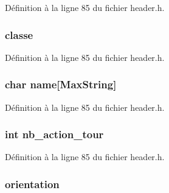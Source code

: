 Définition à la ligne 85 du fichier header.\-h.

\hypertarget{structt__character_a6d86411cdb6af508aed7d5904887ac6e}{
\subsubsection[{classe}]{ classe}}\label{structt__character_a6d86411cdb6af508aed7d5904887ac6e}


Définition à la ligne 85 du fichier header.\-h.

\hypertarget{structt__character_ab27f28c5ead39031421706ddbbd1edea}{
\subsubsection[{name}]{\setlength{\rightskip}{0pt plus 5cm}char name\mbox{[}{\bf Max\-String}\mbox{]}}}\label{structt__character_ab27f28c5ead39031421706ddbbd1edea}


Définition à la ligne 85 du fichier header.\-h.

\hypertarget{structt__character_aaff424b51f4bd3db2c199cc08f21f86d}{
\subsubsection[{nb\-\_\-action\-\_\-tour}]{\setlength{\rightskip}{0pt plus 5cm}int nb\-\_\-action\-\_\-tour}}\label{structt__character_aaff424b51f4bd3db2c199cc08f21f86d}


Définition à la ligne 85 du fichier header.\-h.

\hypertarget{structt__character_af778044107ad1a59b9725fa3962560ad}{
\subsubsection[{orientation}]{ orientation}}\label{structt__character_af778044107ad1a59b9725fa3962560ad}



